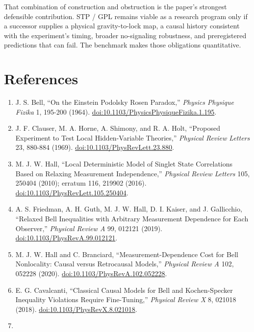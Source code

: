 \documentclass[
  american,
  11pt,
  letterpaper,
]{article}
\providecommand{\tightlist}{%
  \setlength{\itemsep}{0pt}\setlength{\parskip}{0pt}}
\begin{document}
That combination of construction and obstruction is the paper's strongest defensible contribution. STP / GPL remains viable as a research program only if a successor supplies a physical gravity-to-lock map, a causal history consistent with the experiment's timing, broader no-signaling robustness, and preregistered predictions that can fail. The benchmark makes those obligations quantitative.

\section{References}\label{references}

\begin{enumerate}
\def\labelenumi{\arabic{enumi}.}
\tightlist
\item
  J. S. Bell, ``On the Einstein Podolsky Rosen Paradox,'' \emph{Physics Physique Fizika} 1, 195-200 (1964). \href{https://doi.org/10.1103/PhysicsPhysiqueFizika.1.195}{doi:10.1103/PhysicsPhysiqueFizika.1.195}.
\item
  J. F. Clauser, M. A. Horne, A. Shimony, and R. A. Holt, ``Proposed Experiment to Test Local Hidden-Variable Theories,'' \emph{Physical Review Letters} 23, 880-884 (1969). \href{https://doi.org/10.1103/PhysRevLett.23.880}{doi:10.1103/PhysRevLett.23.880}.
\item
  M. J. W. Hall, ``Local Deterministic Model of Singlet State Correlations Based on Relaxing Measurement Independence,'' \emph{Physical Review Letters} 105, 250404 (2010); erratum 116, 219902 (2016). \href{https://doi.org/10.1103/PhysRevLett.105.250404}{doi:10.1103/PhysRevLett.105.250404}.
\item
  A. S. Friedman, A. H. Guth, M. J. W. Hall, D. I. Kaiser, and J. Gallicchio, ``Relaxed Bell Inequalities with Arbitrary Measurement Dependence for Each Observer,'' \emph{Physical Review A} 99, 012121 (2019). \href{https://doi.org/10.1103/PhysRevA.99.012121}{doi:10.1103/PhysRevA.99.012121}.
\item
  M. J. W. Hall and C. Branciard, ``Measurement-Dependence Cost for Bell Nonlocality: Causal versus Retrocausal Models,'' \emph{Physical Review A} 102, 052228 (2020). \href{https://doi.org/10.1103/PhysRevA.102.052228}{doi:10.1103/PhysRevA.102.052228}.
\item
  E. G. Cavalcanti, ``Classical Causal Models for Bell and Kochen-Specker Inequality Violations Require Fine-Tuning,'' \emph{Physical Review X} 8, 021018 (2018). \href{https://doi.org/10.1103/PhysRevX.8.021018}{doi:10.1103/PhysRevX.8.021018}.
\item

\end{enumerate}
\end{document}
